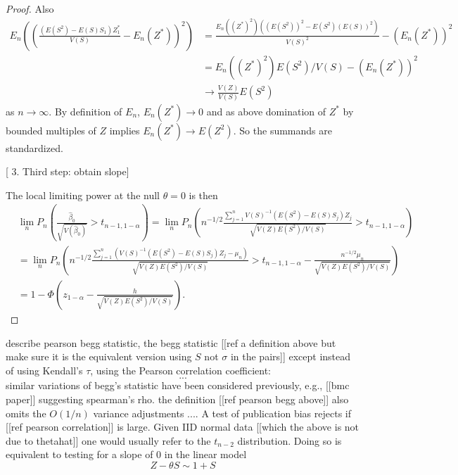 \documentclass{article}
\newcommand{\gm}{\theta}
\newcommand{\E}{E}
\renewcommand{\P}{P}
\newcommand{\V}{V}
\newcommand{\sel}[1]{#1^*}
\newcommand{\z}{Z}
\newcommand{\s}{S}
\begin{document}
\begin{proof}
  Also
  \begin{align}
    \E_n\left(\left(\frac{(\E(S^2)-\E(S)S_1)\sel Z_1}{\V(S)} -\E_n(\sel Z)  \right)^2\right) &= \frac{\E_n((\sel Z)^2)((\E(S^2))^2-\E(S^2)(\E(S))^2)}{\V(S)^2} - (\E_n(\sel Z))^2\\
                                                                                             &= \E_n((\sel Z)^2)\E(S^2)/\V(S) - (\E_n(\sel Z))^2\\
                                                                                             &\rightarrow \frac{\V(Z)}{\V(S)}\E(S^2)
  \end{align}
  as $n\to\infty$. By definition of $E_n$, $\E_n(\sel Z)\to 0$ and as
  above domination of $\sel Z$ by bounded multiples of $Z$ implies
  $\E_n(\sel Z)\to \E(Z^2)$. So the summands are standardized.

  [  3. Third step: obtain slope]
  
  The local limiting power at the null $\theta=0$ is then
  \begin{align}
    &\lim_n \P_n\left(\frac{\hat{\beta}_0}{\sqrt{\V(\hat{\beta}_0)}} > t_{n-1,1-\alpha}\right)
      = \lim_n\P_n\left(n^{-1/2}\frac{\sum_{j=1}^n\V(S)^{-1}(\E(S^2)-\E(S)S_j)Z_j}{\sqrt{\V(Z)\E(S^2)/\V(S)}} > t_{n-1,1-\alpha} \right)\\
    &= \lim_n\P_n\left(n^{-1/2}\frac{\sum_{j=1}^n\left(\V(S)^{-1}(\E(S^2)-\E(S)S_j)Z_j - \mu_n\right)}{\sqrt{\V(Z)\E(S^2)/\V(S)}} > t_{n-1,1-\alpha} -\frac{n^{-1/2}\mu_n}{\sqrt{\V(Z)\E(S^2)/\V(S)}}   \right)\\
    &= 1-\Phi\left(z_{1-\alpha} - \frac{h}{\sqrt{\V(Z)\E(S^2)/\V(S)}}\right).
  \end{align}
  
\end{proof}




describe pearson begg statistic, the begg statistic [[ref a definition above but make sure it is the equivalent version using $\s$ not $\sigma$ in the pairs]] except instead of using Kendall's $\tau$, using the Pearson correlation coefficient:
$$
...
$$
similar variations of begg's statistic have been considered
previously, e.g., [[bmc paper]] suggesting spearman's rho. the
definition [[ref pearson begg above]] also omits the $O(1/n)$ variance
adjustments $...$. A test of publication bias rejects if [[ref pearson
correlation]] is large. Given IID normal data [[which the above is not
due to thetahat]] one would usually refer to the $t_{n-2}$
distribution. Doing so is equivalent to testing for a slope of 0 in
the linear model
$$
\z-\gm\s \sim 1 + \s
$$
\end{document}
